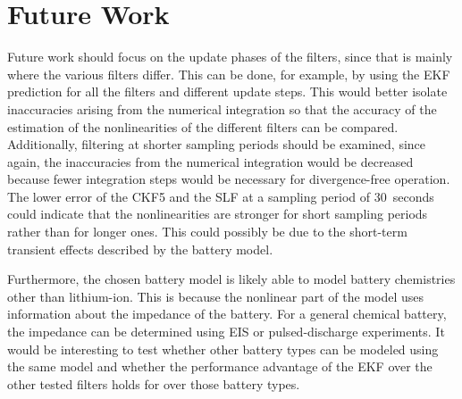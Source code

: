\documentclass[../zhang_thesis.tex]{subfiles}
\begin{document}
\section{Future Work}

Future work should focus on the update phases of the filters, since that is mainly where the various filters differ. This can be done, for example, by using the EKF prediction for all the filters and different update steps. This would better isolate inaccuracies arising from the numerical integration so that the accuracy of the estimation of the nonlinearities of the different filters can be compared. Additionally, filtering at shorter sampling periods should be examined,
since again, the inaccuracies from the numerical integration would be decreased because fewer integration steps would be necessary for divergence-free operation. The lower error of the CKF5 and the SLF at a sampling period of 30~seconds could indicate that the nonlinearities are stronger for short sampling periods rather than for longer ones. This could possibly be due to the short-term transient effects described by the battery model.

Furthermore, the chosen battery model is likely able to model battery chemistries other than lithium-ion. This is because the nonlinear part of the model uses information about the impedance of the battery. For a general chemical battery, the impedance can be determined using EIS or pulsed-discharge experiments. It would be interesting to test whether other battery types can be modeled using the same model and whether the performance advantage of the EKF over the other tested filters holds for over those battery types.
\end{document}
